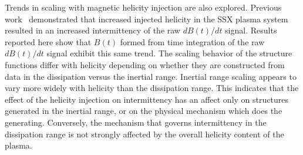 \documentclass[preprint2]{aastex}
\begin{document}
Trends in scaling with magnetic helicity injection are also explored. Previous work~\citep{schaffner2014b} demonstrated that increased injected helicity in the SSX plasma system resulted in an increased intermittency of the raw $dB(t)/dt$ signal. Results reported here show that $B(t)$ formed from time integration of the raw $dB(t)/dt$ signal exhibit this same trend. The scaling behavior of the structure functions differ with helicity depending on whether they are constructed from data in the dissipation versus the inertial range. Inertial range scaling appears to vary more widely with helicity than the dissipation range. This indicates that the effect of the helicity injection on intermittency has an affect only on structures generated in the inertial range, or on the physical mechanism which does the generating. Conversely, the mechanism that governs intermittency in the dissipation range is not strongly affected by the overall helicity content of the plasma.
\end{document}
